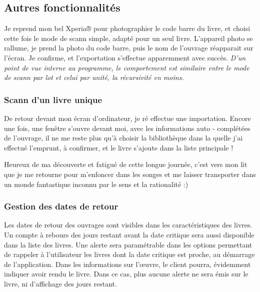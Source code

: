 \subsection {Autres fonctionnalités}

Je reprend mon bel Xperia® pour photographier le code barre du livre, et choisi cette fois le mode de scann simple, adapté pour un seul livre. 
L'appareil photo se rallume, je prend la photo du code barre, puis le nom de l'ouvrage réapparait sur l'écran.
Je confirme, et l'exportation s'effectue apparemment avec succès. 
\emph{D'un point de vue interne au programme, le comportement est similaire entre le mode de scann par lot et celui par unité, la récursivité en moins.}

\subsubsection {Scann d'un livre unique}
De retour devant mon écran d'ordinateur, je ré effectue une importation. 
Encore une fois, une fenêtre s'ouvre devant moi, avec les informations auto - complétées de l'ouvrage, il ne me reste plus qu'à choisir la bibliothèque dans la quelle j'ai effectué l'emprunt, à confirmer, et le livre s'ajoute dans la liste principale !

Heureux de ma découverte et fatigué de cette longue journée, c'est vers mon lit que je me retourne pour m'enfoncer dans les songes et me laisser transporter dans un monde fantastique inconnu par le sens et la rationalité :) 

\subsubsection {Gestion des dates de retour}
Les dates de retour des ouvrages sont visibles dans les caractéristiques des livres. 
Un compte à rebours des jours restant avant la date critique sera aussi disponible dans la liste des livres.
Une alerte sera paramétrable dans les options permettant de rappeler à l'utilisateur les livres dont la date critique est proche, au démarrage de l'application.
Dans les informations sur l'œuvre, le client pourra, évidemment indiquer avoir rendu le livre.
Dans ce cas, plus aucune alerte ne sera émis sur le livre, ni d'affichage des jours restant.
